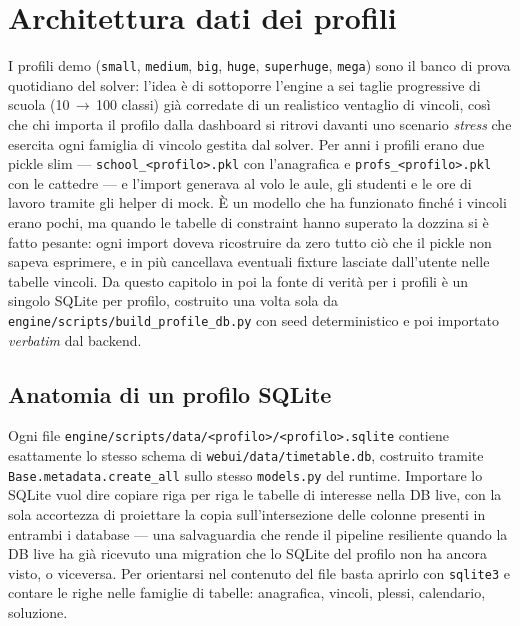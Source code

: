 \chapter{Architettura dati dei profili}
\label{ch:architettura_dati_profili}

I profili demo (\texttt{small}, \texttt{medium}, \texttt{big},
\texttt{huge}, \texttt{superhuge}, \texttt{mega}) sono il banco di
prova quotidiano del solver: l'idea \`e di sottoporre l'engine a
sei taglie progressive di scuola (10\,$\to$\,100 classi) gi\`a corredate
di un realistico ventaglio di vincoli, cos\`i che chi importa il
profilo dalla dashboard si ritrovi davanti uno scenario \emph{stress}
che esercita ogni famiglia di vincolo gestita dal solver. Per anni
i profili erano due pickle slim --- \texttt{school\_<profilo>.pkl}
con l'anagrafica e \texttt{profs\_<profilo>.pkl} con le cattedre ---
e l'import generava al volo le aule, gli studenti e le ore di
lavoro tramite gli helper di mock. \`E un modello che ha funzionato
finch\'e i vincoli erano pochi, ma quando le tabelle di constraint
hanno superato la dozzina si \`e fatto pesante: ogni import doveva
ricostruire da zero tutto ci\`o che il pickle non sapeva esprimere,
e in pi\`u cancellava eventuali fixture lasciate dall'utente nelle
tabelle vincoli. Da questo capitolo in poi la fonte di verit\`a per
i profili \`e un singolo SQLite per profilo, costruito una volta
sola da \texttt{engine/scripts/build\_profile\_db.py} con seed
deterministico e poi importato \emph{verbatim} dal backend.

\section{Anatomia di un profilo SQLite}

Ogni file \texttt{engine/scripts/data/<profilo>/<profilo>.sqlite}
contiene esattamente lo stesso schema di
\texttt{webui/data/timetable.db}, costruito tramite
\texttt{Base.metadata.create\_all} sullo stesso \texttt{models.py}
del runtime. Importare lo SQLite vuol dire copiare riga per riga
le tabelle di interesse nella DB live, con la sola accortezza di
proiettare la copia sull'intersezione delle colonne presenti in
entrambi i database --- una salvaguardia che rende il pipeline
resiliente quando la DB live ha gi\`a ricevuto una migration che lo
SQLite del profilo non ha ancora visto, o viceversa. Per orientarsi
nel contenuto del file basta aprirlo con \texttt{sqlite3} e
contare le righe nelle famiglie di tabelle: anagrafica, vincoli,
plessi, calendario, soluzione.

